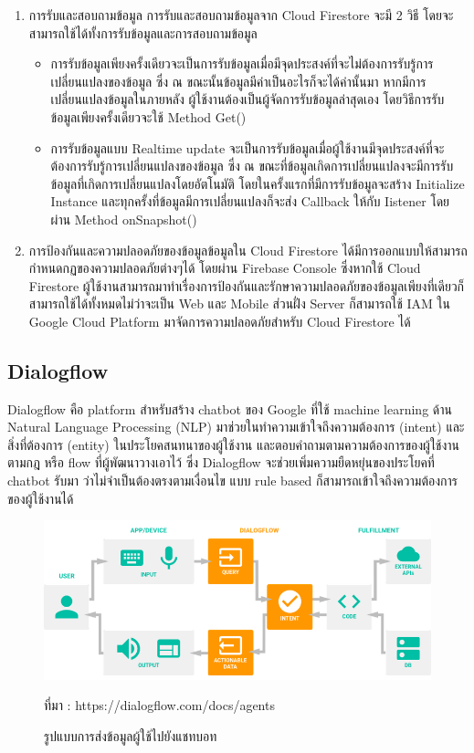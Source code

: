 \begin{enumerate}[label=\arabic*)]
\begin{itemize}
	\end{itemize}
	\item การรับและสอบถามข้อมูล
	การรับและสอบถามข้อมูลจาก Cloud Firestore จะมี 2 วิธี โดยจะสามารถใช้ได้ทั้งการรับข้อมูลและการสอบถามข้อมูล
	\begin{itemize}
		\item การรับข้อมูลเพียงครั้งเดียวจะเป็นการรับข้อมูลเมื่อมีจุดประสงค์ที่จะไม่ต้องการรับรู้การเปลี่ยนแปลงของข้อมูล ซึ่ง ณ ขณะนั้นข้อมูลมีค่าเป็นอะไรก็จะได้ค่านั้นมา หากมีการเปลี่ยนแปลงข้อมูลในภายหลัง ผู้ใช้งานต้องเป็นผู้จัดการรับข้อมูลล่าสุดเอง โดยวิธีการรับข้อมูลเพียงครั้งเดียวจะใช้ Method Get()
		\item การรับข้อมูลแบบ Realtime update จะเป็นการรับข้อมูลเมื่อผู้ใช้งานมีจุดประสงค์ที่จะต้องการรับรู้การเปลี่ยนแปลงของข้อมูล ซึ่ง ณ ขณะที่ข้อมูลเกิดการเปลี่ยนแปลงจะมีการรับข้อมูลที่เกิดการเปลี่ยนแปลงโดยอัตโนมัติ โดยในครั้งแรกที่มีการรับข้อมูลจะสร้าง Initialize Instance และทุกครั้งที่ข้อมูลมีการเปลี่ยนแปลงก็จะส่ง Callback ให้กับ Iistener โดยผ่าน Method onSnapshot()
	\end{itemize}
	\item การป้องกันและความปลอดภัยของข้อมูลข้อมูลใน Cloud Firestore ได้มีการออกแบบให้สามารถกำหนดกฏของความปลอดภัยต่างๆได้ โดยผ่าน Firebase Console  ซึ่งหากใช้ Cloud Firestore ผู้ใช้งานสามารถมาทำเรื่องการป้องกันและรักษาความปลอดภัยของข้อมูลเพียงที่เดียวก็สามารถใช้ได้ทั้งหมดไม่ว่าจะเป็น Web และ Mobile ส่วนฝั่ง Server ก็สามารถใช้ IAM ใน Google Cloud Platform มาจัดการความปลอดภัยสำหรับ Cloud Firestore ได้
\end{enumerate}



\subsection{Dialogflow}
Dialogflow คือ platform สำหรับสร้าง chatbot ของ Google ที่ใช้ machine learning ด้าน Natural Language Processing (NLP) มาช่วยในทำความเข้าใจถึงความต้องการ (intent) และสิ่งที่ต้องการ (entity) ในประโยคสนทนาของผู้ใช้งาน และตอบคำถามตามความต้องการของผู้ใช้งาน ตามกฎ หรือ flow ที่ผู้พัฒนาวางเอาไว้ ซึ่ง Dialogflow จะช่วยเพิ่มความยืดหยุ่นของประโยคที่ chatbot รับมา ว่าไม่จำเป็นต้องตรงตามเงื่อนไข แบบ rule based ก็สามารถเข้าใจถึงความต้องการของผู้ใช้งานได้

 \begin{figure}[H]
	\centering
	\includegraphics[width=0.9\columnwidth]{Figures/2/chatbot}
	\caption{รูปแบบการส่งข้อมูลผู้ใช้ไปยังแชทบอท}{ที่มา : https://dialogflow.com/docs/agents}
	\label{Fig:dialogflow}
\end{figure}

